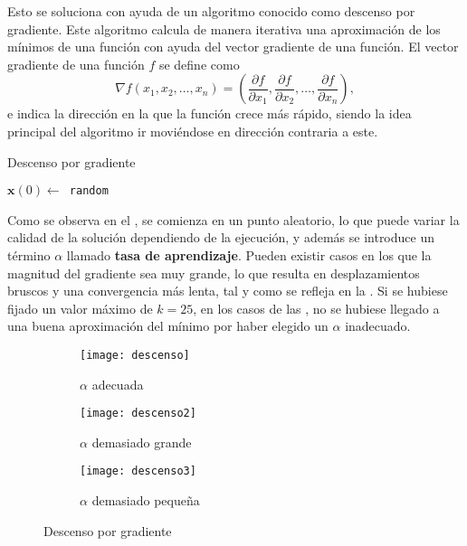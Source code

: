 		Esto se soluciona con ayuda de un algoritmo conocido como descenso por gradiente\cite{descenso}. Este algoritmo calcula de manera iterativa una aproximación de los mínimos de una función con ayuda del vector gradiente de una función. El vector gradiente de una función $f$ se define como 
		$$
		\nabla f(x_1, x_2, \hdots, x_n) = \left(\frac{\partial f}{\partial x_1}, \frac{\partial f}{\partial x_2}, \hdots, \frac{\partial f}{\partial x_n}\right), 
		$$
		e indica la dirección en la que la función crece más rápido, siendo la idea principal del algoritmo ir moviéndose en dirección contraria a este. 
		
		\begin{algorithm}
			\DontPrintSemicolon
			
			\caption{Descenso por gradiente}
			\label{algo:descenso}
			
			$\textbf{x}(0) \gets$\texttt{ random}\\
		\end{algorithm}
		
		Como se observa en el , se comienza en un punto aleatorio, lo que puede variar la calidad de la solución dependiendo de la ejecución, y además se introduce un término $\alpha$ llamado \textbf{tasa de aprendizaje}. Pueden existir casos en los que la magnitud del gradiente sea muy grande, lo que resulta en desplazamientos bruscos y una convergencia más lenta, tal y como se refleja en la . Si se hubiese fijado un valor máximo de $k = 25$, en los casos de las , no se hubiese llegado a una buena aproximación del mínimo por haber elegido un $\alpha$ inadecuado. 
		
		\begin{figure}[H]
			\centering
			\begin{subfigure}{.3\textwidth}
				\centering
				\texttt{[image: descenso]}
				\caption{$\alpha$ adecuada}
			\end{subfigure}
			\begin{subfigure}{.3\textwidth}
				\centering
				\texttt{[image: descenso2]}
				\caption{$\alpha$ demasiado grande}
				\label{fig:descenso_grande}
			\end{subfigure}
			\begin{subfigure}{.3\textwidth}
				\centering
				\texttt{[image: descenso3]}
				\caption{$\alpha$ demasiado pequeña}
				\label{fig:descenso_peq}
			\end{subfigure}
			\caption{Descenso por gradiente}
			\label{fig:descenso}
		\end{figure}
		
